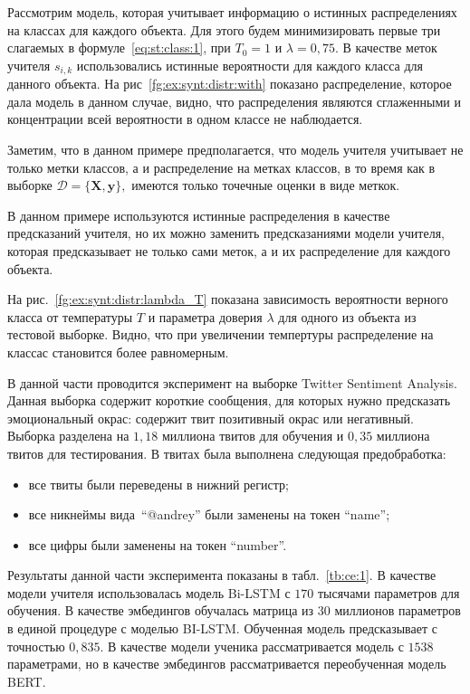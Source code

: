 Рассмотрим модель, которая учитывает информацию о истинных распределениях на классах для каждого объекта. Для этого будем минимизировать первые три слагаемых в формуле~\eqref{eq:st:class:1}, при $T_0=1$ и $\lambda=0{,}75$. В качестве меток учителя $s_{i,k}$ использовались истинные вероятности для каждого класса для данного объекта. На рис~\ref{fg:ex:synt:distr:with} показано распределение, которое дала модель в данном случае, видно, что распределения являются сглаженными и концентрации всей вероятности в одном классе не наблюдается.

Заметим, что в данном примере предполагается, что модель учителя учитывает не только метки классов, а и распределение на метках классов, в то время как в выборке $\mathcal{D} = \{\mathbf{X}, \mathbf{y}\},$ имеются только точечные оценки в виде меткок. 

В данном примере используются истинные распределения в качестве предсказаний учителя, но их можно заменить предсказаниями модели учителя, которая предсказывает не только сами меток, а и их распределение для каждого объекта.

На рис.~\ref{fg:ex:synt:distr:lambda_T} показана зависимость вероятности верного класса от температуры $T$ и параметра доверия $\lambda$ для одного из объекта из тестовой выборке. Видно, что при увеличении темпертуры распределение на классас становится более равномерным.

В данной части проводится эксперимент на выборке Twitter Sentiment Analysis. Данная выборка содержит короткие сообщения, для которых нужно предсказать эмоциональный окрас: содержит твит позитивный окрас или негативный. Выборка разделена на $1{,}18$ миллиона твитов для обучения и $0{,}35$ миллиона твитов для тестирования. В твитах была выполнена следующая предобработка:
\begin{itemize}
	\item все твиты были переведены в нижний регистр;
	\item все никнеймы вида~``@andrey'' были заменены на токен ``name'';
	\item все цифры были заменены на токен ``number''.
\end{itemize}
Результаты данной части эксперимента показаны в табл.~\ref{tb:ce:1}. В качестве модели учителя использовалась модель Bi-LSTM с $170$ тысячами параметров для обучения. В качестве эмбедингов обучалась матрица из $30$ миллионов параметров в единой процедуре с моделью BI-LSTM. Обученная модель предсказывает с точностью $0{,}835$. В качестве модели ученика рассматривается модель с $1538$ параметрами, но в качестве эмбедингов рассматривается переобученная модель BERT.

